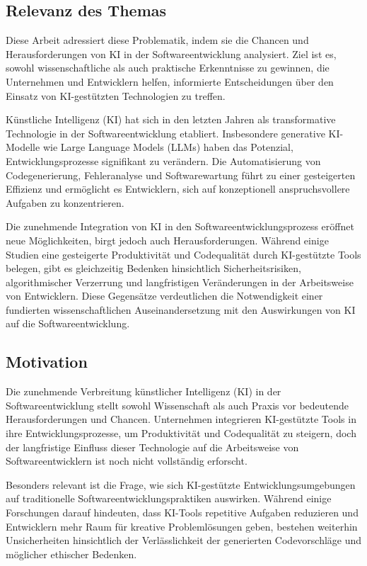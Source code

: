 \subsection{Relevanz des Themas}
Diese Arbeit adressiert diese Problematik, indem sie die Chancen und Herausforderungen von KI in der Softwareentwicklung analysiert. Ziel ist es, sowohl wissenschaftliche als auch praktische Erkenntnisse zu gewinnen, die Unternehmen und Entwicklern helfen, informierte Entscheidungen über den Einsatz von KI-gestützten Technologien zu treffen.

Künstliche Intelligenz (KI) hat sich in den letzten Jahren als transformative Technologie in der Softwareentwicklung etabliert. Insbesondere generative KI-Modelle wie Large Language Models (LLMs) haben das Potenzial, Entwicklungsprozesse signifikant zu verändern. Die Automatisierung von Codegenerierung, Fehleranalyse und Softwarewartung führt zu einer gesteigerten Effizienz und ermöglicht es Entwicklern, sich auf konzeptionell anspruchsvollere Aufgaben zu konzentrieren.

Die zunehmende Integration von KI in den Softwareentwicklungsprozess eröffnet neue Möglichkeiten, birgt jedoch auch Herausforderungen. Während einige Studien eine gesteigerte Produktivität und Codequalität durch KI-gestützte Tools belegen, gibt es gleichzeitig Bedenken hinsichtlich Sicherheitsrisiken, algorithmischer Verzerrung und langfristigen Veränderungen in der Arbeitsweise von Entwicklern. Diese Gegensätze verdeutlichen die Notwendigkeit einer fundierten wissenschaftlichen Auseinandersetzung mit den Auswirkungen von KI auf die Softwareentwicklung.

\subsection{Motivation}
Die zunehmende Verbreitung künstlicher Intelligenz (KI) in der Softwareentwicklung stellt sowohl Wissenschaft als auch Praxis vor bedeutende Herausforderungen und Chancen. Unternehmen integrieren KI-gestützte Tools in ihre Entwicklungsprozesse, um Produktivität und Codequalität zu steigern, doch der langfristige Einfluss dieser Technologie auf die Arbeitsweise von Softwareentwicklern ist noch nicht vollständig erforscht.

Besonders relevant ist die Frage, wie sich KI-gestützte Entwicklungsumgebungen auf traditionelle Softwareentwicklungspraktiken auswirken. Während einige Forschungen darauf hindeuten, dass KI-Tools repetitive Aufgaben reduzieren und Entwicklern mehr Raum für kreative Problemlösungen geben, bestehen weiterhin Unsicherheiten hinsichtlich der Verlässlichkeit der generierten Codevorschläge und möglicher ethischer Bedenken.